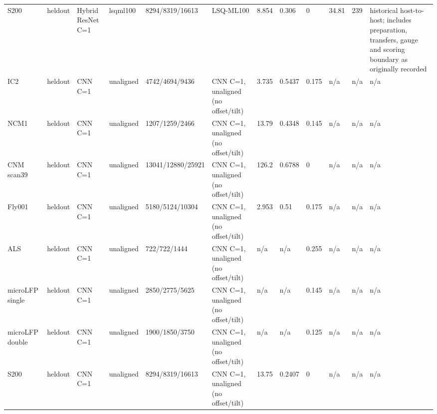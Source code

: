 \begin{tabular}{llllllllllll}
S200 & heldout & Hybrid ResNet C=1 & lsqml100 & 8294/8319/16613 & LSQ-ML100 & 8.854 & 0.306 & 0 & 34.81 & 239 & historical host-to-host; includes preparation, transfers, gauge and scoring boundary as originally recorded \\
IC2 & heldout & CNN C=1 & unaligned & 4742/4694/9436 & CNN C=1, unaligned (no offset/tilt) & 3.735 & 0.5437 & 0.175 & n/a & n/a & n/a \\
NCM1 & heldout & CNN C=1 & unaligned & 1207/1259/2466 & CNN C=1, unaligned (no offset/tilt) & 13.79 & 0.4348 & 0.145 & n/a & n/a & n/a \\
CNM scan39 & heldout & CNN C=1 & unaligned & 13041/12880/25921 & CNN C=1, unaligned (no offset/tilt) & 126.2 & 0.6788 & 0 & n/a & n/a & n/a \\
Fly001 & heldout & CNN C=1 & unaligned & 5180/5124/10304 & CNN C=1, unaligned (no offset/tilt) & 2.953 & 0.51 & 0.175 & n/a & n/a & n/a \\
ALS & heldout & CNN C=1 & unaligned & 722/722/1444 & CNN C=1, unaligned (no offset/tilt) & n/a & n/a & 0.255 & n/a & n/a & n/a \\
microLFP single & heldout & CNN C=1 & unaligned & 2850/2775/5625 & CNN C=1, unaligned (no offset/tilt) & n/a & n/a & 0.145 & n/a & n/a & n/a \\
microLFP double & heldout & CNN C=1 & unaligned & 1900/1850/3750 & CNN C=1, unaligned (no offset/tilt) & n/a & n/a & 0.125 & n/a & n/a & n/a \\
S200 & heldout & CNN C=1 & unaligned & 8294/8319/16613 & CNN C=1, unaligned (no offset/tilt) & 13.75 & 0.2407 & 0 & n/a & n/a & n/a \\
\bottomrule
\end{tabular}
